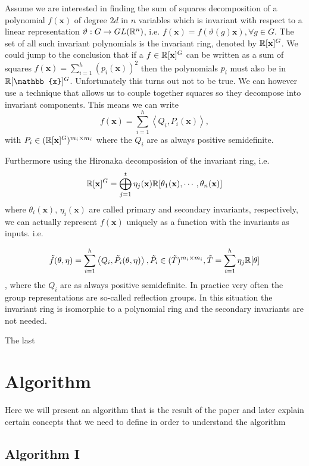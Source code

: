 \documentclass[]{article}
\begin{document}
Assume we are interested in finding the sum of squares decomposition of a polynomial $f(\textbf{x})$ of degree $2d$ in $n$
variables which is invariant with respect to a linear representation $\vartheta:G\rightarrow GL(\mathbb R^n)$, i.e. $f(\textbf{x}) = f(\vartheta(g)\textbf{x}), \forall g\in G$.
The set of all such invariant polynomials is the invariant ring, denoted by $\mathbb R[\textbf{x}]^G$. We could jump to the conclusion that if a $f\in \mathbb R[\textbf{x}]^G$ can be written as a 
sum of squares $f(\textbf{x}) =\sum_{i=1}^{h}(p_i(\textbf{x}))^2$ then the polynomials $p_i$ must also be in $\R[\mathbb{x}]^G$. Unfortunately this turns out not to be true. We can however
use a technique that allows us to couple together squares so they decompose into invariant components. This means we can write 
\[f(\textbf{x}) = \sum_{i=1}^{h}\left<Q_i,P_i(\mathbf{x})\right>,\]
with $P_i\in (\mathbb R[\mathbf{x}]^G)^{m_i\times m_i}$
where the $Q_i$ are as always positive semidefinite.


Furthermore using the Hironaka decomposision of the invariant ring, i.e.
\[\mathbb R[\mathbf{x}]^G = \bigoplus_{j=1}^{t}\eta_j(\textbf{x})\mathbb R[\theta_1(\textbf{x}), \cdots, \theta_n(\mathbf{x})]\] 
where $\theta_i(\mathbf{x})$, $\eta_i(\mathbf{x})$ are called primary and secondary invariants, respectively, 
we can actually represent $f(\mathbf{x})$ uniquely as a function with the invariants as inputs. i.e.

\[\tilde{f}(\theta,\eta) = \sum_{i=1}^{h}\left<Q_i,\tilde{P}_i(\theta,\eta)\right>, \tilde{P_i} \in (\tilde{T})^{m_i\times m_i}, \tilde{T} = \sum_{i=1}^{h}\eta_j\mathbb R[\theta]\],
where the $Q_i$ are as always positive semidefinite.
In practice very often the group representations are so-called reflection groups. In this situation the invariant ring is 
isomorphic to a polynomial ring and the secondary invariants are not needed.

The last 



\section{Algorithm}
Here we will present an algorithm that is the result of the paper and later explain certain concepts that we need to define in order to understand the algorithm

\subsection*{Algorithm I}
\end{document}
